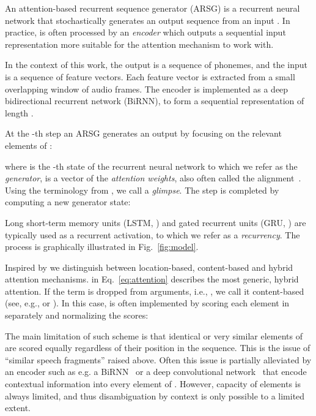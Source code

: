 \documentclass{article}
\begin{document}
An attention-based recurrent sequence generator (ARSG) is a recurrent neural
network that stochastically generates an output sequence 
from an input .  In practice,  is often processed by an {\it encoder}
which outputs a sequential input representation  more
suitable for the attention mechanism to work with.

In the context of this work, the output  is a sequence of phonemes, and the
input  is a sequence of feature vectors. Each feature
vector is extracted from a small overlapping window of audio frames. The encoder
is implemented as a deep bidirectional recurrent network (BiRNN), to form a
sequential representation  of length .

At the -th step an ARSG generates an output  by focusing on the relevant
elements of :

where  is the -th state of the recurrent neural network to which
we refer as the {\it generator},  is a vector of the
{\it attention weights}, also often called the
alignment~\cite{bahdanau_neural_2014}. Using the terminology from
\cite{mnih_2014}, we call  a {\it glimpse}. The step is completed by
computing a new generator state:

Long short-term memory units (LSTM, \cite{hochreiter_1997}) and gated recurrent
units (GRU, \cite{cho_2014}) are typically used as a recurrent activation, to
which we refer as a {\it recurrency}.  The process is graphically illustrated in
Fig.~\ref{fig:model}.

Inspired by \cite{graves_2014}  we distinguish between location-based,
content-based and hybrid attention mechanisms.  in
Eq.~\eqref{eq:attention} describes the most generic, hybrid attention. If the
term  is dropped from  arguments, i.e.,
,
we call it content-based (see, e.g., \cite{bahdanau_neural_2014} or
\cite{xu_show_2015}). In this case,  is often implemented by scoring
each element in  separately and normalizing the scores:
    



The main limitation of such scheme is that identical or very similar elements of
 are scored equally regardless of their position in the
sequence. This is the issue of ``similar speech fragments'' raised above.
Often this issue is partially alleviated by an encoder such
as e.g. a BiRNN~\cite{bahdanau_neural_2014} or a deep convolutional
network~\cite{xu_show_2015} that encode contextual
information into every element of  . However, capacity of
 elements is always limited, and thus disambiguation by
context is only possible to a limited extent.
\end{document}
